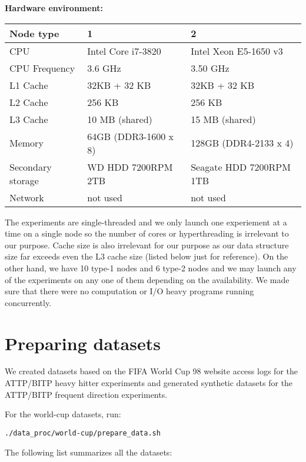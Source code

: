 \documentclass[11pt]{article}
\begin{document}
\newpage
{\bf Hardware environment:}

\vspace{1mm}
\begin{tabular}{|l|l|l|}
	\hline
	Node type &  1 & 2 \\\hline
	CPU & Intel Core i7-3820 & Intel Xeon E5-1650 v3 \\\hline
	CPU Frequency & 3.6 GHz & 3.50 GHz \\\hline
	L1 Cache & 32KB + 32 KB & 32KB + 32 KB\\\hline
	L2 Cache & 256 KB & 256 KB\\\hline
	L3 Cache & 10 MB (shared) & 15 MB (shared) \\\hline
	Memory & 64GB (DDR3-1600 x 8) & 128GB (DDR4-2133 x 4) \\\hline
	Secondary storage & WD HDD 7200RPM 2TB & Seagate HDD 7200RPM 1TB
	\\\hline
	Network & not used & not used \\\hline
\end{tabular}
\vspace{1mm}

The experiments are single-threaded and we only
launch one experiement at a time on a single node so the number of
cores or hyperthreading is irrelevant to our purpose. Cache size is
also irrelevant for our purpose as our data structure size far exceeds
even the L3 cache size (listed below just for reference). On the other
hand, we have 10 type-1 nodes and 6 type-2 nodes and we may launch any
of the experiments on any one of them depending on the availability.
We made sure that there were no computation or I/O heavy programs
running concurrently.

\section{Preparing datasets}

We created datasets based on the FIFA World Cup 98 website access logs
for the ATTP/BITP heavy hitter experiments and generated synthetic
datasets for the ATTP/BITP frequent direction experiments.

For the world-cup datasets, run:
\begin{verbatim}
./data_proc/world-cup/prepare_data.sh
\end{verbatim}



The
following list summarizes all the datasets:

\begin{tabular}{}
\end{tabular}
\end{document}
